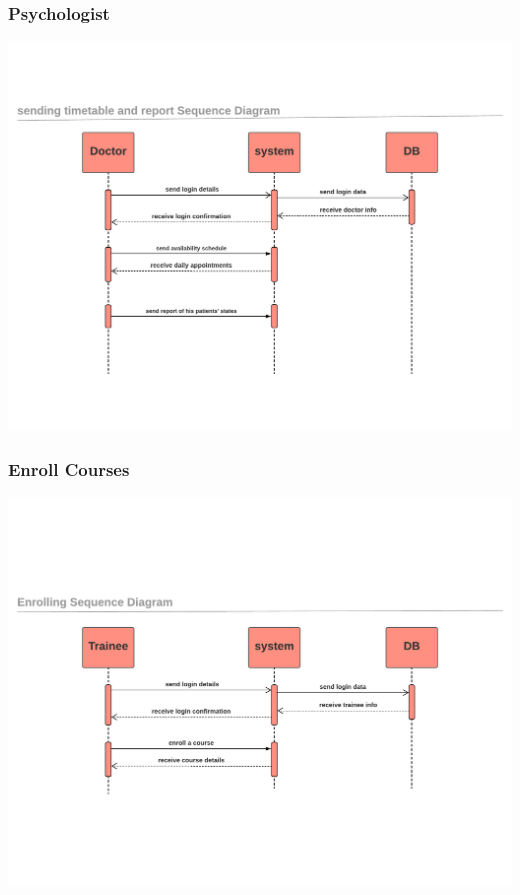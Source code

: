 \documentclass[../Psychological_system_web_application.tex]{subfiles}
\begin{document}
							
							
						\subsubsection{Psychologist}
							
								\includegraphics[width=\textwidth ,height=0.4\textheight ,scale=4]{Diagrams/sequence_diagram/doctor_sequence_diagram.pdf}
								\label{FIG:2.09}
							
							
							
						\subsubsection{Enroll Courses}
							
								\includegraphics[width=\textwidth ,height=0.4\textheight ,scale=4]{Diagrams/sequence_diagram/enrolling.pdf}
								\label{FIG:2.10}
							
\end{document}
